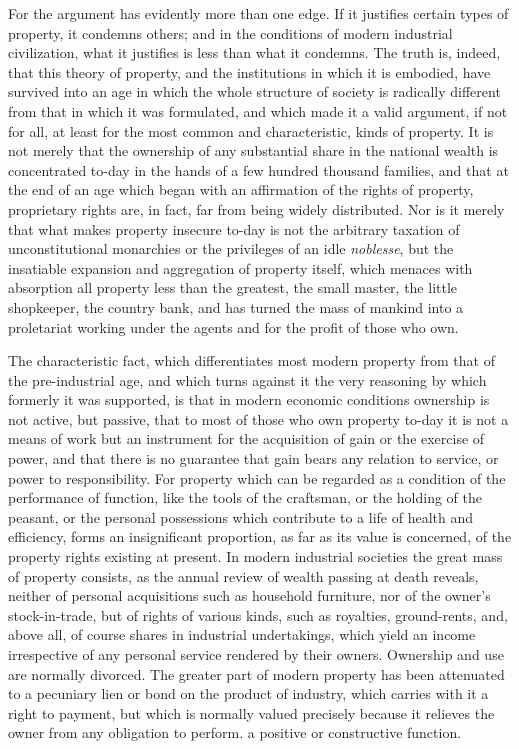 \documentclass{book}
\begin{document}
For the argument has evidently more than one edge. If it justifies certain types of property, it condemns others; and in the conditions of modern industrial civilization, what it justifies is less than what it condemns. The truth is, indeed, that this theory of property, and the institutions in which it is embodied, have survived into an age in which the whole structure of society is radically different from that in which it was formulated, and which made it a valid argument, if not for all, at least for the most common and characteristic, kinds of property. It is not merely that the ownership of any substantial share in the national wealth is concentrated to-day in the hands of a few hundred thousand families, and that at the end of an age which began with an affirmation of the rights of property, proprietary rights are, in fact, far from being widely distributed. Nor is it merely that what makes property insecure to-day is not the arbitrary taxation of unconstitutional monarchies or the privileges of an idle \emph{noblesse}, but the insatiable expansion and aggregation of property itself, which menaces with absorption all property less than the greatest, the small master, the little shopkeeper, the country bank, and has turned the mass of mankind into a proletariat working under the agents and for the profit of those who own.

The characteristic fact, which differentiates most modern property from that of the pre-industrial age, and which turns against it the very reasoning by which formerly it was supported, is that in modern economic conditions ownership is not active, but passive, that to most of those who own property to-day it is not a means of work but an instrument for the acquisition of gain or the exercise of power, and that there is no guarantee that gain bears any relation to service, or power to responsibility. For property which can be regarded as a condition of the performance of function, like the tools of the craftsman, or the holding of the peasant, or the personal possessions which contribute to a life of health and efficiency, forms an insignificant proportion, as far as its value is concerned, of the property rights existing at present. In modern industrial societies the great mass of property consists, as the annual review of wealth passing at death reveals, neither of personal acquisitions such as household furniture, nor of the owner’s stock-in-trade, but of rights of various kinds, such as royalties, ground-rents, and, above all, of course shares in industrial undertakings, which yield an income irrespective of any personal service rendered by their owners. Ownership and use are normally divorced. The greater part of modern property has been attenuated to a pecuniary lien or bond on the product of industry, which carries with it a right to payment, but which is normally valued precisely because it relieves the owner from any obligation to perform. a positive or constructive function.
\end{document}
